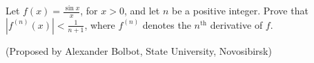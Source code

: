 Let $f(x)=\frac{\sin x}{x}$, for $x>0$, and let $n$ be a positive integer. Prove that $|f^{(n)}(x)|<\frac{1}{n+1}$, where $f^{(n)}$ denotes the $n^{\mathrm{th}}$ derivative of $f$.

(Proposed by Alexander Bolbot, State University, Novosibirsk)
